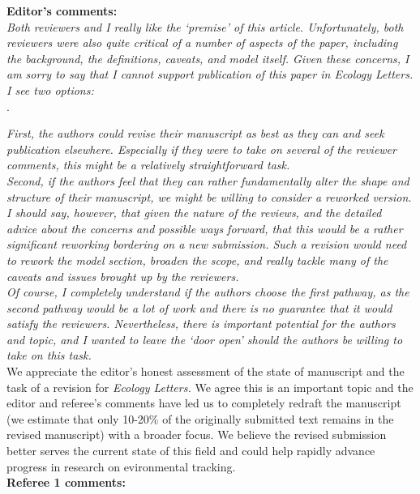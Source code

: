 \documentclass[11pt]{article}
\begin{document}
{\bf Editor's comments:} \\

\emph{Both reviewers and I really like the `premise' of this article.  Unfortunately, both
reviewers were also quite critical of a number of aspects of the paper, including the
background, the definitions, caveats, and model itself.  Given these concerns, I am sorry to
say that I cannot support publication of this paper in Ecology Letters.  I see two options:}\\ .

\emph{First, the authors could revise their manuscript as best as they can and seek publication
elsewhere. Especially if they were to take on several of the reviewer comments, this might be
a relatively straightforward task.}\\

\emph{Second, if the authors feel that they can rather fundamentally alter the shape and structure
of their manuscript, we might be willing to consider a reworked version. I should say,
however, that given the nature of the reviews, and the detailed advice about the concerns and
possible ways forward, that this would be a rather significant reworking bordering on a new
submission. Such a revision would need to rework the model section, broaden the scope, and
really tackle many of the caveats and issues brought up by the reviewers.}\\

\emph{Of course, I completely understand if the authors choose the first pathway, as the second
pathway would be a lot of work and there is no guarantee that it would satisfy the reviewers.
Nevertheless, there is important potential for the authors and topic, and I wanted to leave
the `door open' should the authors be willing to take on this task.}\\

We appreciate the editor's honest assessment of the state of manuscript and the task of a revision for \emph{Ecology Letters.} We agree this is an important topic and the editor and referee's comments have led us to completely redraft the manuscript (we estimate that only 10-20\% of the originally submitted text remains in the revised manuscript) with a broader focus. We believe the revised submission better serves the current state of this field and could help rapidly advance progress in research on evironmental tracking.\\

{\bf Referee 1 comments:} \\
\end{document}
